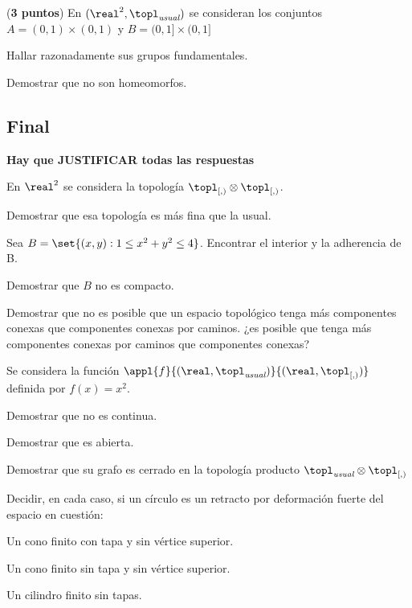 \begin{problem} ({\bf 3 puntos}) En $(\real^2, \topl_{\textit{usual}})$ se consideran los conjuntos ${A = (0,1) \times (0,1) }$ y ${B = (0,1] \times (0,1] }$

\ppart Hallar razonadamente sus grupos fundamentales.

\ppart Demostrar que no son homeomorfos.

\solution
\end{problem}

\newpage
\subsection{Final}
{\bf Hay que JUSTIFICAR todas las respuestas}

\begin{problem}[1]
En $\real^2$ se considera la topología $\topl_{[,)} \otimes \topl_{[,)}$.

\ppart Demostrar que esa topología es más fina que la usual.

\ppart Sea ${B = \set{(x,y) : 1\leq x^2 + y^2 \leq 4} }$. Encontrar el interior y la adherencia de B.

\ppart Demostrar que $B$ no es compacto.

\solution
\end{problem}


\begin{problem}
Demostrar que no es posible que un espacio topológico tenga más componentes conexas que componentes conexas por caminos. ¿es posible que tenga más componentes conexas por caminos que componentes conexas?

\solution
\end{problem}


\begin{problem}
Se considera la función $\appl{f}{(\real,\topl_{\textit{usual}})}{(\real,\topl_{[,)})}$ definida por ${f(x) = x^2 }$.

\ppart Demostrar que no es continua.

\ppart Demostrar que es abierta.

\ppart Demostrar que su grafo es cerrado en la topología producto ${\topl_{\textit{usual}} \otimes \topl_{[,)}}$
\solution
\end{problem}


\begin{problem}
Decidir, en cada caso, si un círculo es un retracto por deformación fuerte del espacio en cuestión:

\ppart Un cono finito con tapa y sin vértice superior.

\ppart Un cono finito sin tapa y sin vértice superior.

\ppart Un cilindro finito sin tapas.
\solution
\end{problem}
